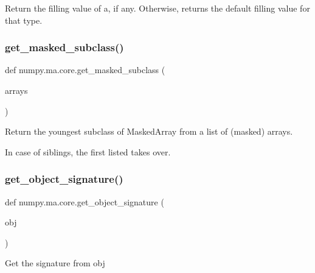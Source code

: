 \begin{DoxyVerb}Return the filling value of a, if any.  Otherwise, returns the
default filling value for that type.\end{DoxyVerb}
 \mbox{\label{namespacenumpy_1_1ma_1_1core_afe28e50d05730fa2e50ec6c8f2aa5457}} 
\subsubsection{\texorpdfstring{get\+\_\+masked\+\_\+subclass()}{get\_masked\_subclass()}}
{\footnotesize\ttfamily def numpy.\+ma.\+core.\+get\+\_\+masked\+\_\+subclass (\begin{DoxyParamCaption}\item[{}]{arrays }\end{DoxyParamCaption})}

\begin{DoxyVerb}Return the youngest subclass of MaskedArray from a list of (masked) arrays.

In case of siblings, the first listed takes over.\end{DoxyVerb}
 \mbox{\label{namespacenumpy_1_1ma_1_1core_a5c2767f7d78663b87366eda291e0fcdf}} 
\subsubsection{\texorpdfstring{get\+\_\+object\+\_\+signature()}{get\_object\_signature()}}
{\footnotesize\ttfamily def numpy.\+ma.\+core.\+get\+\_\+object\+\_\+signature (\begin{DoxyParamCaption}\item[{}]{obj }\end{DoxyParamCaption})}

\begin{DoxyVerb}Get the signature from obj\end{DoxyVerb}
 \mbox{\label{namespacenumpy_1_1ma_1_1core_a6f5ef3e05d2344f931a42d8ab6e14d66}} 
